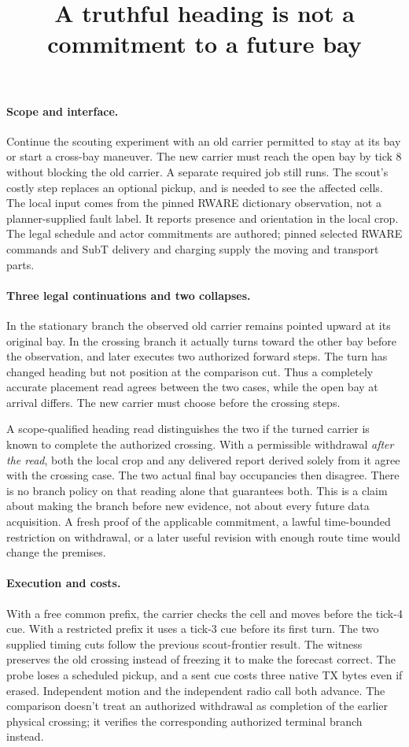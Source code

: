 \documentclass[11pt]{article}
\title{A truthful heading is not a commitment to a future bay}
\author{}\date{}
\begin{document}
\maketitle

\paragraph{Scope and interface.}
Continue the scouting experiment with an old carrier permitted to stay
at its bay or start a cross-bay maneuver. The new carrier must reach the
open bay by tick 8 without blocking the old carrier. A separate required
job still runs. The scout's costly step replaces an optional pickup,
and is needed to see the affected cells. The local input comes from the
pinned RWARE dictionary observation, not a planner-supplied fault label.
It reports presence and orientation in the local crop. The legal schedule
and actor commitments are authored; pinned selected RWARE commands and
SubT delivery and charging supply the moving and transport parts.

\paragraph{Three legal continuations and two collapses.}
In the stationary branch the observed old carrier remains pointed
upward at its original bay. In the crossing branch it actually turns
toward the other bay before the observation, and later executes two
authorized forward steps. The turn has changed heading but not
position at the comparison cut. Thus a completely accurate placement
read agrees between the two cases, while the open bay at arrival
differs. The new carrier must choose before the crossing steps.

A scope-qualified heading read distinguishes the two if the
turned carrier is known to complete the authorized crossing.
With a permissible withdrawal \emph{after the read}, both the local crop
and any delivered report derived solely from it agree with the crossing
case. The two actual final bay occupancies then disagree. There is
no branch policy on that reading alone that guarantees both. This is a
claim about making the branch before new evidence, not about every
future data acquisition. A fresh proof of the applicable commitment,
a lawful time-bounded restriction on withdrawal, or a later useful
revision with enough route time would change the premises.

\paragraph{Execution and costs.}
With a free common prefix, the carrier checks the cell and moves
before the tick-4 cue. With a restricted prefix it uses a tick-3 cue
before its first turn. The two supplied timing cuts follow the
previous scout-frontier result. The witness preserves the old
crossing instead of freezing it to make the forecast correct.
The probe loses a scheduled pickup, and a sent cue costs three
native TX bytes even if erased. Independent motion and the
independent radio call both advance. The comparison doesn't treat an
authorized withdrawal as completion of the earlier physical crossing;
it verifies the corresponding authorized terminal branch instead.
\end{document}
